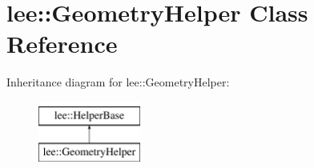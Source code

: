 \hypertarget{classlee_1_1GeometryHelper}{\section{lee\-:\-:Geometry\-Helper Class Reference}
\label{classlee_1_1GeometryHelper}
}
Inheritance diagram for lee\-:\-:Geometry\-Helper\-:\begin{figure}[H]
\begin{center}
\leavevmode
\includegraphics[height=2.000000cm]{classlee_1_1GeometryHelper}
\end{center}
\end{figure}
